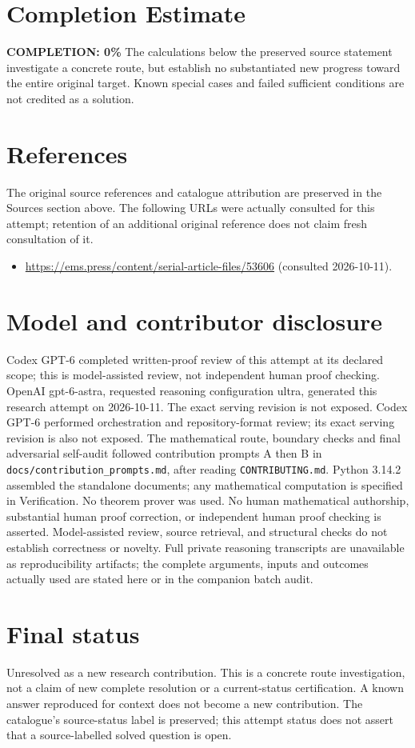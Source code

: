 \documentclass[11pt]{article}
\begin{document}
\section{Completion Estimate}
\noindent\textbf{COMPLETION: 0\%}
The calculations below the preserved source statement investigate a concrete route,
but establish no substantiated new progress toward the entire original target.
Known special cases and failed sufficient conditions are not credited as a solution.
\section{References}
The original source references and catalogue attribution are preserved in the
Sources section above. The following URLs were actually consulted for this attempt;
retention of an additional original reference does not claim fresh consultation of it.
\begin{itemize}
\item \url{https://ems.press/content/serial-article-files/53606} (consulted 2026-10-11). 
\end{itemize}
\section{Model and contributor disclosure}
Codex GPT-6 completed written-proof review of this attempt at its declared scope; this is model-assisted review, not independent human proof checking.
OpenAI gpt-6-astra, requested reasoning configuration ultra, generated this research
attempt on 2026-10-11. The exact serving revision is not exposed. Codex GPT-6
performed orchestration and repository-format review; its exact serving revision
is also not exposed. The mathematical route, boundary checks and final adversarial
self-audit followed contribution prompts A then B in
\texttt{docs/contribution\_prompts.md}, after reading \texttt{CONTRIBUTING.md}.
Python 3.14.2 assembled the standalone documents; any mathematical computation is
specified in Verification. No theorem prover was used. No human mathematical
authorship, substantial human proof correction, or independent human proof checking
is asserted. Model-assisted review, source retrieval, and structural checks do not
establish correctness or novelty. Full private reasoning transcripts are unavailable
as reproducibility artifacts; the complete arguments, inputs and outcomes actually
used are stated here or in the companion batch audit.
\section{Final status}
Unresolved as a new research contribution. This is a concrete route investigation,
not a claim of new complete resolution or a current-status certification. A known
answer reproduced for context does not become a new contribution. The catalogue's
source-status label is preserved; this attempt status does not assert that a
source-labelled solved question is open.
\end{document}
